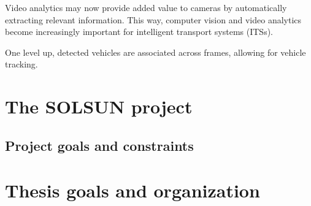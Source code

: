 Video analytics may now provide added value to cameras by automatically
extracting relevant information. This way, computer
vision and video analytics become increasingly important for
intelligent transport systems (ITSs).

One level up, detected vehicles
are associated across frames, allowing for vehicle tracking.
\section{The SOLSUN project}
\subsection{Project goals and constraints}

\section{Thesis goals and organization}
